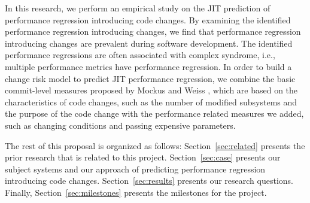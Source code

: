 In this research, we perform an empirical study on the JIT prediction of performance regression introducing code changes. 
By examining the identified performance regression introducing changes, we find that performance regression introducing changes are prevalent during software development. The identified performance regressions are often associated with complex syndrome, i.e., multiple performance metrics have performance regression. In order to build a change risk model to predict JIT performance regression, we combine the basic commit-level measures proposed by Mockus and Weiss \cite{mockus2000predicting}, which are based on the characteristics of code changes, such as the number of modified subsystems and the purpose of the code change with the performance related measures we added, such as changing conditions and passing expensive parameters.



The rest of this proposal is organized as follows: Section~\ref{sec:related} presents the prior research that is related to this project. Section~\ref{sec:case} presents our subject systems and our approach of predicting performance regression introducing code changes. Section~\ref{sec:results} presents our research questions. Finally, Section~\ref{sec:milestones} presents the milestones for the project.

